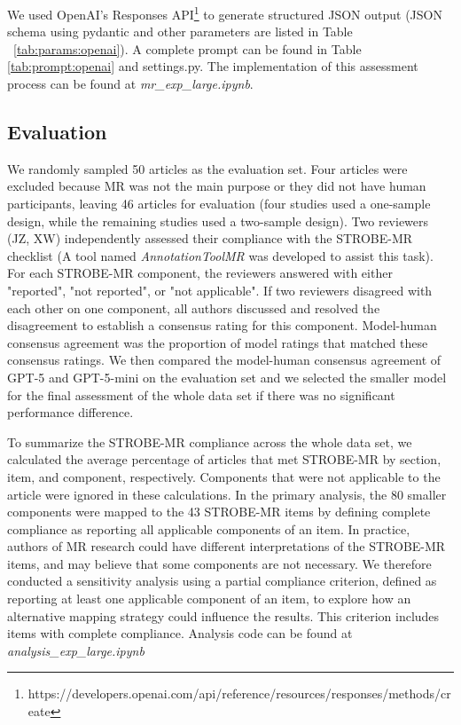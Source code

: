 We used OpenAI's Responses API\footnote{https://developers.openai.com/api/reference/resources/responses/methods/create} to generate structured JSON output (JSON schema using pydantic and other parameters are listed in Table ~\ref{tab:params:openai}). A complete prompt can be found in Table \ref{tab:prompt:openai} and settings.py. The implementation of this assessment process can be found at \textit{mr\_exp\_large.ipynb}.  




\subsection{Evaluation}

We randomly sampled 50 articles as the evaluation set. Four articles were excluded because MR was not the main purpose or they did not have human participants, leaving 46 articles for evaluation (four studies used a one-sample design, while the remaining studies used a two-sample design). Two reviewers (JZ, XW) independently assessed their compliance with the STROBE-MR checklist (A tool named \textit{AnnotationToolMR} was developed to assist this task). For each STROBE-MR component, the reviewers answered with either "reported", "not reported", or "not applicable". If two reviewers disagreed with each other on one component, all authors discussed and resolved the disagreement to establish a consensus rating for this component. Model-human consensus agreement was the proportion of model ratings that matched these consensus ratings. We then compared the model-human consensus agreement of GPT-5 and GPT-5-mini on the evaluation set and we selected the smaller model for the final assessment of the whole data set if there was no significant performance difference. 

To summarize the STROBE-MR compliance across the whole data set, we calculated the average percentage of articles that met STROBE-MR by section, item, and component, respectively. Components that were not applicable to the article were ignored in these calculations. In the primary analysis, the 80 smaller components were mapped to the 43 STROBE-MR items by defining complete compliance as reporting all applicable components of an item. In practice, authors of MR research could have different interpretations of the STROBE-MR items, and may believe that some components are not necessary. We therefore conducted a sensitivity analysis using a partial compliance criterion, defined as reporting at least one applicable component of an item, to explore how an alternative mapping strategy could influence the results. This criterion includes items with complete compliance. Analysis code can be found at \textit{analysis\_exp\_large.ipynb}

